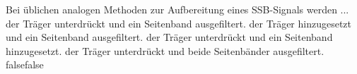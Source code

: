     {Bei üblichen analogen Methoden zur Aufbereitung eines SSB-Signals werden ...}
    {der Träger unterdrückt und ein Seitenband ausgefiltert.}
    {der Träger hinzugesetzt und ein Seitenband ausgefiltert.}
    {der Träger unterdrückt und ein Seitenband hinzugesetzt.}
    {der Träger unterdrückt und beide Seitenbänder ausgefiltert.}
    {false}{false}